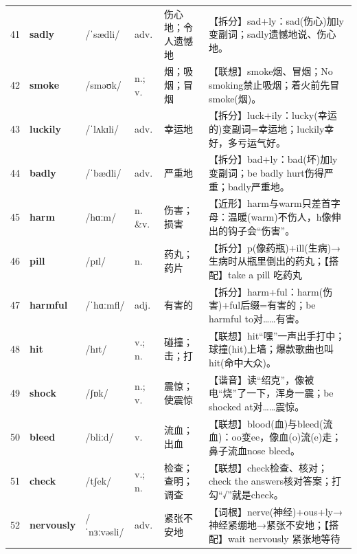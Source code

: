 \documentclass[UTF8,a4paper,11pt,oneside]{ctexbook}
\newcommand{\cellword}[1]{{\bfseries\textcolor{wordcol}{#1}}}
\newcommand{\cellipa}[1]{{\footnotesize\textcolor{ipacol}{#1}}}
\newcommand{\cellpos}[1]{\textcolor{poscol}{#1}}
\newcommand{\cellno}[1]{\textcolor{volcolor!75!black}{#1}}
\begin{document}
{\begin{longtable}{@{}C{0.045\textwidth}L{0.155\textwidth}L{0.175\textwidth}C{0.070\textwidth}L{0.180\textwidth}L{0.282\textwidth}@{}}
 \cellno{41} & \cellword{sadly} & \cellipa{/ˈsædli/} & \cellpos{adv.} & 伤心地；令人遗憾地 & \textcolor{tagSplit}{【拆分】}sad+ly：sad(伤心)加ly变副词；sadly遗憾地说、伤心地。 \\
\cellno{42} & \cellword{smoke} & \cellipa{/sməʊk/} & \cellpos{n.;\allowbreak{} v.} & 烟；吸烟；冒烟 & \textcolor{tagAssoc}{【联想】}smoke烟、冒烟；No smoking禁止吸烟；着火前先冒smoke(烟)。 \\
 \cellno{43} & \cellword{luckily} & \cellipa{/ˈlʌkɪli/} & \cellpos{adv.} & 幸运地 & \textcolor{tagSplit}{【拆分】}luck+ily：lucky(幸运的)变副词=幸运地；luckily幸好，多亏运气好。 \\
\cellno{44} & \cellword{badly} & \cellipa{/ˈbædli/} & \cellpos{adv.} & 严重地 & \textcolor{tagSplit}{【拆分】}bad+ly：bad(坏)加ly变副词；be badly hurt伤得严重；badly严重地。 \\
 \cellno{45} & \cellword{harm} & \cellipa{/hɑːm/} & \cellpos{n. \&v.} & 伤害；损害 & \textcolor{tagNear}{【近形】}harm与warm只差首字母：温暖(warm)不伤人，h像伸出的钩子会“伤害”。 \\
\cellno{46} & \cellword{pill} & \cellipa{/pɪl/} & \cellpos{n.} & 药丸；药片 & \textcolor{tagSplit}{【拆分】}p(像药瓶)+ill(生病)→\allowbreak{}生病时从瓶里倒出的药丸；\textcolor{tagColloc}{【搭配】}take a pill 吃药丸 \\
 \cellno{47} & \cellword{harmful} & \cellipa{/ˈhɑːmfl/} & \cellpos{adj.} & 有害的 & \textcolor{tagSplit}{【拆分】}harm+ful：harm(伤害)+ful后缀=有害的；be harmful to对……有害。 \\
\cellno{48} & \cellword{hit} & \cellipa{/hɪt/} & \cellpos{v.;\allowbreak{} n.} & 碰撞；击；打 & \textcolor{tagAssoc}{【联想】}hit“嘿”一声出手打中；球撞(hit)上墙；爆款歌曲也叫hit(命中大众)。 \\
 \cellno{49} & \cellword{shock} & \cellipa{/ʃɒk/} & \cellpos{n.;\allowbreak{} v.} & 震惊；使震惊 & \textcolor{tagSound}{【谐音】}读“绍克”，像被电“烧”了一下，浑身一震；be shocked at对……震惊。 \\
\cellno{50} & \cellword{bleed} & \cellipa{/bliːd/} & \cellpos{v.} & 流血；出血 & \textcolor{tagAssoc}{【联想】}blood(血)与bleed(流血)：oo变ee，像血(o)流(e)走；鼻子流血nose bleed。 \\
 \cellno{51} & \cellword{check} & \cellipa{/tʃek/} & \cellpos{v.;\allowbreak{} n.} & 检查；查明；调查 & \textcolor{tagAssoc}{【联想】}check检查、核对；check the answers核对答案；打勾“√”就是check。 \\
\cellno{52} & \cellword{nervously} & \cellipa{/ˈnɜːvəsli/} & \cellpos{adv.} & 紧张不安地 & \textcolor{tagRoot}{【词根】}nerve(神经)+ous+ly→\allowbreak{}神经紧绷地→\allowbreak{}紧张不安地；\textcolor{tagColloc}{【搭配】}wait nervously 紧张地等待 \\
\end{longtable}
}
\end{document}
